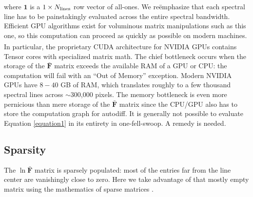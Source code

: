 \documentclass[modern]{aastex631}
\begin{document}
where $\mathbf{1}$ is a $1\times N_{\rm lines}$ row vector of all-ones. We re\"emphasize that each spectral line has to be painstakingly evaluated across the entire spectral bandwidth.   Efficient GPU algorithms exist for voluminous matrix manipulations such as this one, so this computation can proceed as quickly as possible on modern machines. In particular, the proprietary CUDA architecture for NVIDIA\textsuperscript{\tiny\textregistered} GPUs contains Tensor cores with specialized matrix math. The chief bottleneck occurs when the storage of the $\bm{\bar{F}}$ matrix exceeds the available RAM of a GPU or CPU: the computation will fail with an ``Out of Memory'' exception. Modern NVIDIA GPUs have $8-40$ GB of RAM, which translates roughly to a few thousand spectral lines across $\sim$300,000 pixels.  The memory bottleneck is even more pernicious than mere storage of the $\bm{\bar{F}}$ matrix since the CPU/GPU also has to store the computation graph for autodiff. It is generally not possible to evaluate Equation \ref{equation1} in its entirety in one-fell-swoop. A remedy is needed.


\subsection{Sparsity}

The $\ln{\bm{\bar{F}}}$ matrix is sparsely populated: most of the entries far from the line center are vanishingly close to zero. Here we take advantage of that mostly empty matrix using the mathematics of sparse matrices \citep{saad03:IMS}.
\end{document}
